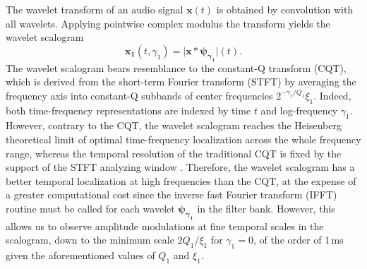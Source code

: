 \documentclass[journal]{IEEEtran}
\begin{document}
The wavelet transform of an audio signal
$\boldsymbol{x}(t)$ is obtained by convolution with all wavelets.
Applying pointwise complex modulus the transform yields
the wavelet scalogram
\begin{equation}
\boldsymbol{x_1}(t, \gamma_1)
= \vert \boldsymbol{x} \ast \boldsymbol{\psi_{\gamma_1}} \vert (t)\mbox{.}
\end{equation}
The wavelet scalogram bears resemblance to the constant-Q transform (CQT),
which is derived from the short-term Fourier transform (STFT) by averaging the frequency
axis into constant-Q subbands of center frequencies $2^{-\gamma_1/Q_1}\xi_1$.
Indeed, both time-frequency representations are indexed by time $t$ and log-frequency $\gamma_1$.
However, contrary to the CQT, the wavelet scalogram reaches the Heisenberg
theoretical limit of optimal time-frequency localization across the whole
frequency range, whereas the temporal resolution of the traditional CQT is fixed by the support of the STFT analyzing window \cite{Brown1992}.
Therefore, the wavelet scalogram has a better temporal localization at high
frequencies than the CQT, at the expense of a greater computational cost
since the inverse fast Fourier transform (IFFT) routine must be called for each wavelet $\boldsymbol{\psi_{\gamma_1}}$ in the filter bank.
However, this allows us to observe amplitude modulations at fine temporal scales in the scalogram, down to the minimum scale $2Q_1/\xi_1$ for $\gamma_1 = 0$, of the order of $1\,\textrm{ms}$ given the aforementioned values of $Q_1$ and $\xi_1$.
\end{document}
